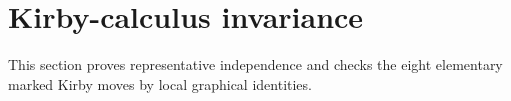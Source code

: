 \section{Kirby-calculus invariance}
\label{sec:kirby-invariance}

This section proves representative independence and checks the eight
elementary marked Kirby moves by local graphical identities.


